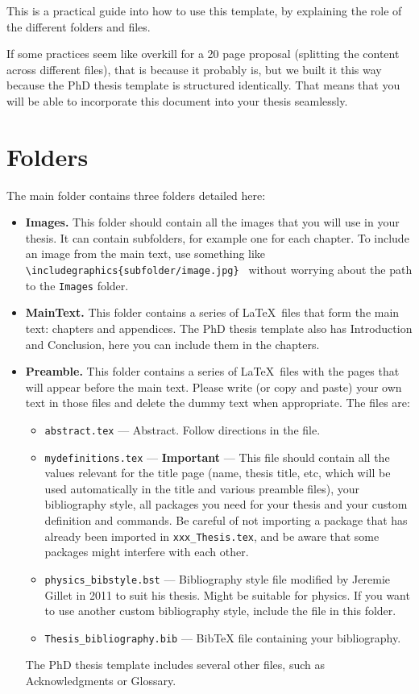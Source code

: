 This is a practical guide into how to use this template, by explaining the role of the different folders and files.

If some practices seem like overkill for a 20 page proposal (splitting the content across different files), that is because it probably is, but we built it this way because the PhD thesis template is structured identically. That means that you will be able to incorporate this document into your thesis seamlessly.

\section{Folders}

The main folder contains three folders detailed here:

\begin{itemize}

\item \textbf{Images.} This folder should contain all the images that you will use in your thesis. It can contain subfolders, for example one for each chapter. To include an image from the main text, use something like \texttt{\textbackslash includegraphics\{subfolder/image.jpg\} } without worrying about the path to the \texttt{Images} folder.

\item \textbf{MainText.} This folder contains a series of \LaTeX\ files that form the main text: chapters and appendices. The PhD thesis template also has Introduction and Conclusion, here you can include them in the chapters.

\item \textbf{Preamble.} This folder contains a series of \LaTeX\ files with the pages that will appear before the main text. Please write (or copy and paste) your own text in those files and delete the dummy text when appropriate. The files are:
\begin{itemize}
\item \texttt{abstract.tex} --- Abstract. Follow directions in the file.
\item \texttt{mydefinitions.tex} --- \textbf{Important} --- This file should contain all the values relevant for the title page (name, thesis title, etc, which will be used automatically in the title and various preamble files), your bibliography style, all packages you need for your thesis and your custom definition and commands. Be careful of not importing a package that has already been imported in \texttt{xxx\_Thesis.tex}, and be aware that some packages might interfere with each other.
\item \texttt{physics\_bibstyle.bst} --- Bibliography style file modified by Jeremie Gillet in 2011 to suit his thesis. Might be suitable for physics. If you want to use another custom bibliography style, include the file in this folder.
\item \texttt{Thesis\_bibliography.bib} --- BibTeX file containing your bibliography.
\end{itemize}

The PhD thesis template includes several other files, such as Acknowledgments or Glossary.  

\end{itemize}

